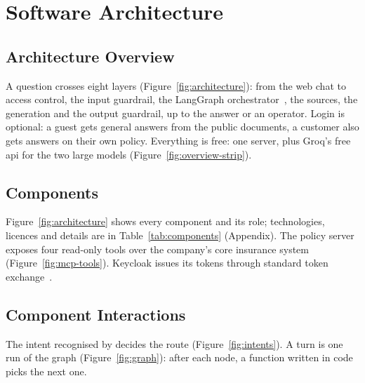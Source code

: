 \chapter{Software Architecture}
\label{chap:architecture}

\section{Architecture Overview}
\label{sec:architecture-overview}

A question crosses eight layers (Figure~\ref{fig:architecture}): from the web chat to access
control, the input guardrail, the LangGraph orchestrator~\cite{langgraph}, the
sources, the generation and the output guardrail, up to the answer or an operator. Login is optional: a guest gets general answers from the
public documents, a customer also gets answers on their own policy. Everything is free: one
server, plus Groq's free \acs{api} for the two large models (Figure~\ref{fig:overview-strip}).




\section{Components}
\label{sec:components}

Figure~\ref{fig:architecture} shows every component and its role; technologies, licences and
details are in Table~\ref{tab:components} (Appendix). The policy
server~\cite{mcp} exposes four read-only tools over the company's core
insurance system (Figure~\ref{fig:mcp-tools}). Keycloak issues its tokens
through standard token exchange~\cite{keycloak2026tokenexchange}.



\section{Component Interactions}
\label{sec:interactions}

The intent recognised by  decides the route (Figure~\ref{fig:intents}). A turn is
one run of the graph (Figure~\ref{fig:graph}): after each node, a function written in code picks
the next one.




